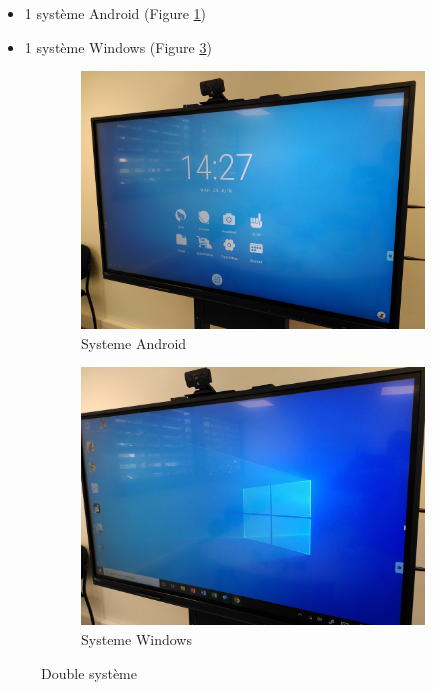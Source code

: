 \documentclass[10pt]{article}
\begin{document}
\begin{itemize}
\item 1 système Android  (Figure \ref{fig:sys-andro})
\item 1 système Windows (Figure \ref{fig:sys-win})
\end{itemize}

\begin{figure}[h!]
	\centering
  	\begin{subfigure}[b]{0.4\textwidth}
		\includegraphics[width=\textwidth]{IMG_20220628_142750.jpg}
		\caption{Systeme Android}
		\label{fig:sys-andro}
	\end{subfigure}
	\hfill
 	\begin{subfigure}[b]{0.4\textwidth}
		\includegraphics[width=\textwidth]{IMG_20220628_143733.jpg}
		\caption{Systeme Windows}
		\label{fig:sys-win}
	\end{subfigure}
	\caption{Double système}
\end{figure}
\end{document}
